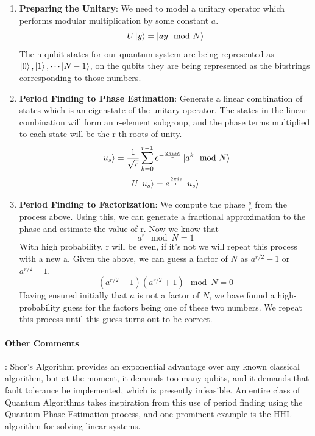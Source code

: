 \begin{enumerate}
    \item \textbf{Preparing the Unitary}: We need to model a unitary operator which performs modular multiplication by some constant $a$.
    \begin{equation}
        U \ket{y} = \ket{ay \mod N}
    \end{equation}
    The n-qubit states for our quantum system are being represented as $\ket{0}, \ket{1}, \cdots \ket{N - 1}$, on the qubits they are being represented as the bitstrings corresponding to those numbers.
    \item \textbf{Period Finding to Phase Estimation}: Generate a linear combination of states which is an eigenstate of the unitary operator. The states in the linear combination will form an r-element subgroup, and the phase terms multiplied to each state will be the r-th roots of unity.
    \begin{equation}
        \ket{u_s} = \frac{1}{\sqrt{r}} \sum_{k=0}^{r-1} e^{-\frac{2\pi i s k}{r}} \ket{a^k \mod N}
    \end{equation}
    \begin{equation}
        U \ket{u_s} = e^{\frac{2 \pi i s}{r}} \ket{u_s}
    \end{equation}
    \item \textbf{Period Finding to Factorization}: We compute the phase $\frac{s}{r}$ from the process above. Using this, we can generate a fractional approximation to the phase and estimate the value of r. Now we know that
    \begin{equation}
        a^r \mod N = 1
    \end{equation}
    With high probability, r will be even, if it's not we will repeat this process with a new a. Given the above, we can guess a factor of $N$ as $a^{r/2} - 1$ or $a^{r/2} + 1$.
    \begin{equation}
        (a^{r/2} - 1) (a^{r/2} + 1) \mod N = 0
    \end{equation}
    Having ensured initially that $a$ is not a factor of $N$, we have found a high-probability guess for the factors being one of these two numbers. We repeat this process until this guess turns out to be correct.
\end{enumerate}

\paragraph*{Other Comments}: Shor's Algorithm provides an exponential advantage over any known classical algorithm, but at the moment, it demands too many qubits, and it demands that fault tolerance be implemented, which is presently infeasible. An entire class of Quantum Algorithms takes inspiration from this use of period finding using the Quantum Phase Estimation process, and one prominent example is the HHL algorithm for solving linear systems.


